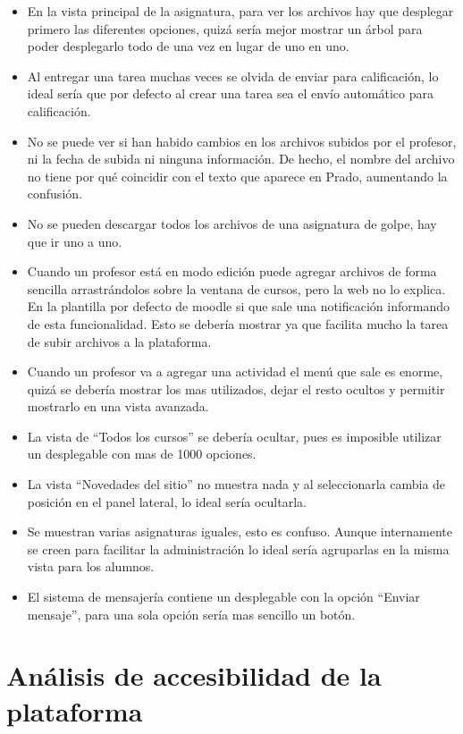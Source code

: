 \begin{itemize}
\item En la vista principal de la asignatura, para ver los archivos hay que desplegar primero las diferentes opciones, quizá sería mejor mostrar un árbol para poder desplegarlo todo de una vez en lugar de uno en uno.
\item Al entregar una tarea muchas veces se olvida de enviar para calificación, lo ideal sería que por defecto al crear una tarea sea el envío automático para calificación.
\item No se puede ver si han habido cambios en los archivos subidos por el profesor, ni la fecha de subida ni ninguna información. De hecho, el nombre del archivo no tiene por qué coincidir con el texto que aparece en Prado, aumentando la confusión.
\item No se pueden descargar todos los archivos de una asignatura de golpe, hay que ir uno a uno.
\item Cuando un profesor está en modo edición puede agregar archivos de forma sencilla arrastrándolos sobre la ventana de cursos, pero la web no lo explica. En la plantilla por defecto de moodle si que sale una notificación informando de esta funcionalidad. Esto se debería mostrar ya que facilita mucho la tarea de subir archivos a la plataforma.
\item Cuando un profesor va a agregar una actividad el menú que sale es enorme, quizá se debería mostrar los mas utilizados, dejar el resto ocultos y permitir mostrarlo en una vista avanzada.
\item La vista de ``Todos los cursos'' se debería ocultar, pues es imposible utilizar un desplegable con mas de 1000 opciones.
\item La vista ``Novedades del sitio'' no muestra nada y al seleccionarla cambia de posición en el panel lateral, lo ideal sería ocultarla.
\item Se muestran varias asignaturas iguales, esto es confuso. Aunque internamente se creen para facilitar la administración lo ideal sería agruparlas en la misma vista para los alumnos.
\item El sistema de mensajería contiene un desplegable con la opción ``Enviar mensaje'', para una sola opción sería mas sencillo un botón.

\end{itemize}

\section{Análisis de accesibilidad de la plataforma}

